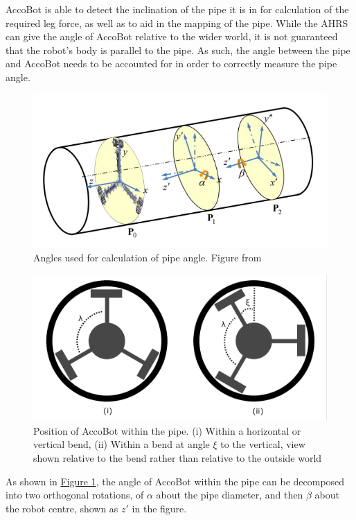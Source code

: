 \documentclass[11pt]{article}		%
\newlength{\imageheight}	 %
\newcommand{\figref}[1]{\hyperref[#1]{Figure \ref*{#1}}}    %
\begin{document}
			AccoBot is able to detect the inclination of the pipe it is in for calculation of the required leg force, as well as to aid in the mapping of the pipe.
			While the AHRS can give the angle of AccoBot relative to the wider world, it is not guaranteed that the robot's body is parallel to the pipe.
			As such, the angle between the pipe and AccoBot needs to be accounted for in order to correctly measure the pipe angle.
			\\
			\begin{figure}[h]
				\centering
				\includegraphics[height=\imageheight]{pipeOrientation}
				\caption{Angles used for calculation of pipe angle. Figure from \cite{park2010normal}}
				\label{pipeOrientation}
			\end{figure}
			\begin{figure}[h]
				\centering
				\includegraphics[height=\imageheight]{pipeAngle}
				\caption{Position of AccoBot within the pipe. (i) Within a horizontal or vertical bend, (ii) Within a bend at angle $\xi$ to the vertical, view shown relative to the bend rather than relative to the outside world}
				\label{pipeAngle}
			\end{figure}
			As shown in \figref{pipeOrientation}, the angle of AccoBot within the pipe can be decomposed into two orthogonal rotations, of $\alpha$ about the pipe diameter, and then $\beta$ about the robot centre, shown as $z'$ in the figure.
\end{document}
